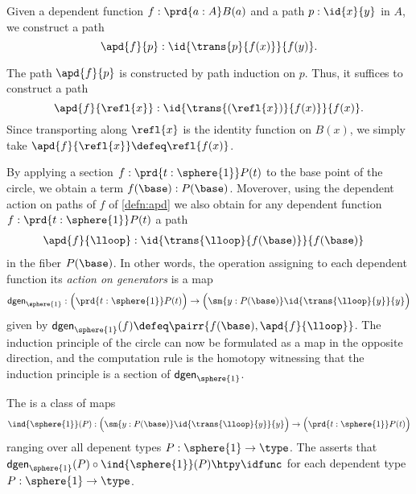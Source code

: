 \begin{defn}\label{defn:apd}
Given a dependent function $f:\prd{a:A}B(a)$ and a path $p:\id{x}{y}$ in $A$, we construct a path
\begin{equation*}
\apd{f}{p} : \id{\trans{p}{f(x)}}{f(y)}.
\end{equation*}
\end{defn}

\begin{constr}
The path $\apd{f}{p}$ is constructed by path induction on $p$. Thus, it suffices to construct a path
\begin{equation*}
\apd{f}{\refl{x}}:\id{\trans{(\refl{x})}{f(x)}}{f(x)}.
\end{equation*}
Since transporting along $\refl{x}$ is the identity function on $B(x)$, we simply take $\apd{f}{\refl{x}}\defeq\refl{f(x)}$. 
\end{constr}

By applying a section $f:\prd{t:\sphere{1}}P(t)$ to the base point of the circle, we obtain a term $f(\base):P(\base)$. Moverover, using the dependent action on paths of $f$ of \autoref{defn:apd} we also obtain for any dependent function $f:\prd{t:\sphere{1}}P(t)$ a path
\begin{align*}
\apd{f}{\lloop} & : \id{\trans{\lloop}{f(\base)}}{f(\base)}
\end{align*}
in the fiber $P(\base)$.
In other words, the operation assigning to each dependent function its \emph{action on generators} is a map
\begin{equation}\label{eq:kappa_circle}
\mathsf{dgen}_{\sphere{1}}:\Big(\prd{t:\sphere{1}}P(t)\Big)\to\Big(\sm{y:P(\base)}\id{\trans{\lloop}{y}}{y}\Big)
\end{equation}
given by $\mathsf{dgen}_{\sphere{1}}(f)\defeq\pairr{f(\base),\apd{f}{\lloop}}$.
The induction principle of the circle can now be formulated as a map in the opposite direction, and the computation rule is the homotopy witnessing that the induction principle is a section of $\mathsf{dgen}_{\sphere{1}}$.

\begin{defn}
The  is a class of maps
\begin{equation*}
\ind{\sphere{1}}(P):\Big(\sm{y:P(\base)}\id{\trans{\lloop}{y}}{y}\Big)\to\Big(\prd{t:\sphere{1}} P(t)\Big)
\end{equation*}
ranging over all depenent types $P:\sphere{1}\to\type$. 
The  asserts that $\mathsf{dgen}_{\sphere{1}}(P) \circ\ind{\sphere{1}}(P) \htpy \idfunc$ for each dependent type $P:\sphere{1}\to\type$. 
\end{defn} 

